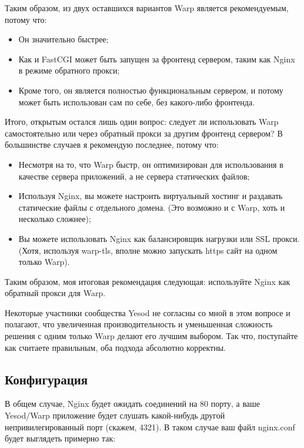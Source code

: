 Таким образом, из двух оставшихся вариантов Warp является рекомендуемым, потому
что:
\begin{itemize}
  \item Он значительно быстрее;

  \item Как и FastCGI может быть запущен за фронтенд сервером, таким как Nginx
      в режиме обратного прокси;

  \item Кроме того, он является полностью функциональным сервером, и потому
      может быть использован сам по себе, без какого-либо фронтенда.
\end{itemize}

Итого, открытым остался лишь один вопрос: следует ли использовать Warp
самостоятельно или через обратный прокси за другим фронтенд сервером? В
большинстве случаев я рекомендую последнее, потому что:
\begin{itemize}
  \item Несмотря на то, что Warp быстр, он оптимизирован для использования в
      качестве сервера приложений, а не сервера статических файлов;

  \item Используя Nginx, вы можете настроить виртуальный хостинг и раздавать
      статические файлы с отдельного домена. (Это возможно и с Warp, хоть и
      несколько сложнее);

  \item Вы можете использовать Nginx как балансировщик нагрузки или SSL прокси.
      (Хотя, используя warp-tls, вполне можно запускать https сайт на одном
      только Warp).
\end{itemize}

Таким образом, моя итоговая рекомендация следующая: используйте Nginx как
обратный прокси для Warp.

\begin{remark}
    Некоторые участники сообщества Yesod не согласны со мной в этом вопросе и
    полагают, что увеличенная производительность и уменьшенная сложность
    решения с одним только Warp делают его лучшим выбором. Так что, поступайте
    как считаете правильным, оба подхода абсолютно корректны.
\end{remark}

\subsection{Конфигурация}
В общем случае, Nginx будет ожидать соединений на 80 порту, а ваше Yesod/Warp
приложение будет слушать какой-нибудь другой непривилегированный порт (скажем,
4321). В таком случае ваш файл nginx.conf будет выглядеть примерно так:


